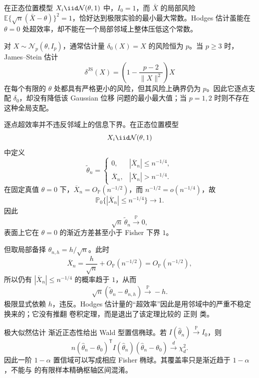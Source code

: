 \begin{workedexample}[均值在局部高斯实验中达到界]
在正态位置模型 $X_i\iid\mathcal N(\theta,1)$ 中，$I_0=1$，而 $\bar X$ 的局部风险 $\mathbb E\{\sqrt n(\bar X-\theta)\}^2=1$，恰好达到极限实验的最小最大常数。Hodges 估计虽能在 $\theta=0$ 处超效率，却不能在一个局部邻域上整体压低这个常数。
\end{workedexample}

\begin{proposition}
对 $X\sim\mathcal N_p(\theta,I_p)$，通常估计量 $\delta_0(X)=X$ 的风险恒为 $p$。当 $p\ge3$ 时，James--Stein 估计
\[
  \delta^{\mathrm{JS}}(X)=\left(1-\frac{p-2}{\|X\|^2}\right)X
\]
在每个有限的 $\theta$ 处都具有严格更小的风险，但其风险上确界仍为 $p$。因此它逐点支配 $\delta_0$，却没有降低该 Gaussian 位移 问题的最小最大值；当 $p=1,2$ 时则不存在这种全局支配。
\end{proposition}

\begin{workedexample}
逐点超效率并不违反邻域上的信息下界。在正态位置模型
\[
 X_i\iid\mathcal N(\theta,1)
\]
中定义
\[
 \widetilde\theta_n
 =\begin{cases}
 0,&|\overline X_n|\le n^{-1/4},\\
 \overline X_n,&|\overline X_n|>n^{-1/4}.
 \end{cases}
\]
在固定真值 $\theta=0$ 下，$\overline X_n=O_{\mathbb P}(n^{-1/2})$，而 $n^{-1/2}=o(n^{-1/4})$，故
\[
 \mathbb P_0\{|\overline X_n|\le n^{-1/4}\}\to1.
\]
因此
\[
 \sqrt n\,\widetilde\theta_n\xrightarrow{\mathbb P}0,
\]
表面上它在 $\theta=0$ 的渐近方差甚至小于 Fisher 下界 $1$。

但取局部备择 $\theta_{n,h}=h/\sqrt n$。此时
\[
 \overline X_n
 =\frac h{\sqrt n}+O_{\mathbb P}(n^{-1/2})
 =O_{\mathbb P}(n^{-1/2}),
\]
所以仍有 $|\overline X_n|\le n^{-1/4}$ 的概率趋于 $1$，从而
\[
 \sqrt n(\widetilde\theta_n-\theta_{n,h})
 \xrightarrow{\mathbb P}-h.
\]
极限显式依赖 $h$，违反。Hodges 估计量的“超效率”因此是用邻域中的严重不稳定换来的；它没有推翻 卷积定理，而是退出了该定理比较的 正则 类。
\end{workedexample}

\begin{corollary}
极大似然估计 渐近正态性给出 Wald 型置信椭球。若 $I(\widehat\theta_n)\xrightarrow{\mathbb P} I_0$，则
\[
 n(\widehat\theta_n-\theta_0)^{\mathsf T}
 I(\widehat\theta_n)
 (\widehat\theta_n-\theta_0)
 \xrightarrow{d}\chi^2_d.
\]
因此一阶 $1-\alpha$ 置信域可以写成相应 Fisher 椭球。其覆盖率只是渐近趋于 $1-\alpha$，不能与  的有限样本精确枢轴区间混淆。
\end{corollary}

